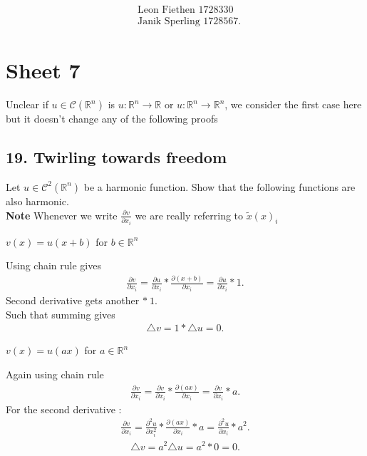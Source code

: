 \begin{align*}
  &\text{Leon Fiethen 1728330}\\
 &\text{Janik Sperling 1728567}
.\end{align*}
\section*{Sheet 7}
Unclear if $u \in  \mathcal{C}(\mathbb{R}^{n} ) $ is $u : \mathbb{R}^{n} \to  \mathbb{R}$ or $u : \mathbb{R}^{n} \to \mathbb{R}^{n}  $, we consider the first case here
but it doesn't change any of the following proofs 
\subsection*{19. Twirling towards freedom}
Let $u \in  \mathcal{C}^{2}(\mathbb{R}^{n} ) $ be a harmonic function. Show that the following functions are also harmonic.\\[1ex]
\textbf{Note } Whenever we write $\frac{\partial v}{\partial x_i}$ we are really referring to $\tilde{x}(x)_i$  
\begin{exercise}[a]
  $v(x) = u(x+b) $ for $b \in  \mathbb{R}^{n} $ 
\end{exercise}
\begin{solution}
 Using chain rule gives 
 \begin{align*}
  \frac{\partial v}{\partial x_i}  = \frac{\partial u}{\partial x_i} *\frac{\partial (x+b)}{\partial x_i}  = \frac{\partial u}{\partial x_i }*1 
 .\end{align*}
 Second derivative gets another $* \ 1$. \\[1ex]
 Such that summing gives 
 \begin{align*}
  \triangle v =  1* \triangle u = 0
 .\end{align*}
\end{solution}
\begin{exercise}[b]
 $v(x) = u(ax)$  for $a \in  \mathbb{R}^{n} $
\end{exercise}
\begin{solution}
 Again using chain rule 
 \begin{align*}
  \frac{\partial v}{\partial x_i}  = \frac{\partial v}{\partial x_i} *\frac{\partial (ax)}{\partial x_i}  = \frac{\partial v}{\partial x_i }*a 
 .\end{align*}
 For the second derivative : 
 \begin{align*}
   \frac{\partial v}{\partial x_i}  = \frac{\partial^2 u}{\partial x_i^2} *\frac{\partial (ax)}{\partial x_i}*a  = \frac{\partial^2 u }{\partial x_i }*a^2
 .\end{align*}
 \begin{align*}
  \triangle v = a^2 \triangle u = a^2 * 0 = 0
 .\end{align*}
\end{solution}
